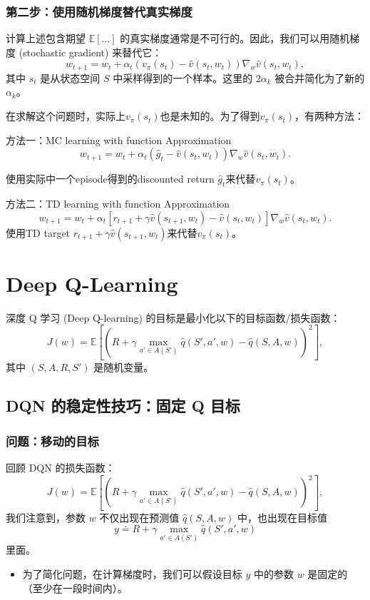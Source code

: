 \documentclass{article}
\begin{document}
\subsubsection*{第二步：使用随机梯度替代真实梯度}
计算上述包含期望 $\mathbb{E}[\dots]$ 的真实梯度通常是不可行的。因此，我们可以用随机梯度 (stochastic gradient) 来替代它：
\[
w_{t+1} = w_t + \alpha_t(v_{\pi}(s_t) - \hat{v}(s_t, w_t))\nabla_w \hat{v}(s_t, w_t),
\]
其中 $s_t$ 是从状态空间 $S$ 中采样得到的一个样本。这里的 $2\alpha_k$ 被合并简化为了新的 $\alpha_k$。

在求解这个问题时，实际上$v_{\pi}(s_t)$也是未知的。为了得到$v_{\pi}(s_t)$，有两种方法：

方法一：MC learning with function Approximation
$$
w_{t+1} = w_t + \alpha_t (\hat{g}_t - \hat{v}(s_t, w_t))\nabla_w \hat{v}(s_t, w_t).
$$

使用实际中一个episode得到的discounted return $\hat{g}_t$来代替$v_{\pi}(s_t)$。

方法二：TD learning with function Approximation
$$
w_{t+1} = w_t + \alpha_t [r_{t+1} + \gamma \hat{v}(s_{t+1}, w_t) - \hat{v}(s_t, w_t)] \nabla_w \hat{v}(s_t, w_t).
$$
使用TD target $r_{t+1} + \gamma \hat{v}(s_{t+1}, w_t)$来代替$v_{\pi}(s_t)$。
\section{Deep Q-Learning}
深度 Q 学习 (Deep Q-learning) 的目标是最小化以下的目标函数/损失函数：
\[
J(w) = \mathbb{E} \left[ \left( R + \gamma \max_{a' \in A(S')} \hat{q}(S', a', w) - \hat{q}(S, A, w) \right)^2 \right],
\]
其中 $(S, A, R, S')$ 是随机变量。
\subsection*{DQN 的稳定性技巧：固定 Q 目标}

\subsubsection*{问题：移动的目标}

回顾 DQN 的损失函数：
\[
J(w) = \mathbb{E} \left[ \left( R + \gamma \max_{a' \in A(S')} \hat{q}(S', a', w) - \hat{q}(S, A, w) \right)^2 \right],
\]
我们注意到，参数 $w$ 不仅出现在预测值 $\hat{q}(S, A, w)$ 中，也出现在目标值
\[
y \doteq R + \gamma \max_{a' \in A(S')} \hat{q}(S', a', w)
\]
里面。

\begin{itemize}
    \item 为了简化问题，在计算梯度时，我们可以假设目标 $y$ 中的参数 $w$ 是固定的（至少在一段时间内）。
\end{itemize}
\end{document}
